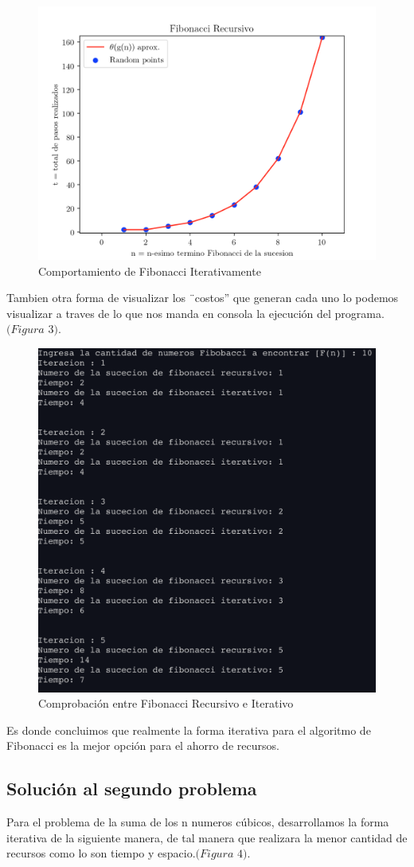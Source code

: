 \documentclass[12pt,twoside]{article}
\begin{document}
\begin{figure}
  \centering
    \includegraphics[height=0.5\textwidth]{Figure2}
  \caption{Comportamiento de Fibonacci Iterativamente}
  \label{fig:ejemplo2}
\end{figure}

Tambien otra forma de visualizar los ¨costos'' que generan cada uno lo podemos visualizar a traves de lo que nos manda en consola
la ejecuci\'on del programa.$(Figura$ $3)$.

\begin{figure}
  \centering
    \includegraphics[height=0.5\textwidth]{Figure3}
  \caption{Comprobaci\'on entre Fibonacci Recursivo e Iterativo}
  \label{fig:ejemplo2}
\end{figure}

Es donde concluimos que realmente la forma iterativa para el algoritmo de Fibonacci es la mejor opci\'on para el ahorro de recursos.

\subsection{\textbf{Soluci\'on al segundo problema}}

Para el problema de la suma de los n numeros c\'ubicos, desarrollamos la forma iterativa de la siguiente manera, de tal manera que
realizara la menor cantidad de recursos como lo son tiempo y espacio.$(Figura$ $4)$.
\end{document}
